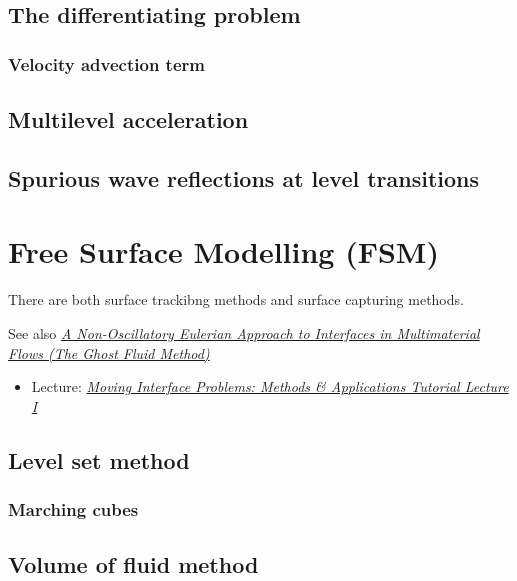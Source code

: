 \section{The differentiating problem}

\subsection{Velocity advection term}

\section{Multilevel acceleration}

\section{Spurious wave reflections at level transitions}

\chapter{Free Surface Modelling (FSM)}

There are both surface trackibng methods and surface capturing methods.

See also \textit{\href{http://physbam.stanford.edu/~fedkiw/papers/cam1998-17.pdf}{A Non-Oscillatory Eulerian Approach to Interfaces in Multimaterial Flows (The Ghost Fluid Method)}}

\begin{itemize}
    \item Lecture: \textit{\href{http://www.ims.nus.edu.sg/Programs/fluiddynamic/files/Lecture1-basics.pdf}{Moving Interface Problems: Methods \& Applications Tutorial Lecture I}}
\end{itemize}

\section{Level set method}

\subsection{Marching cubes}

\section{Volume of fluid method}


